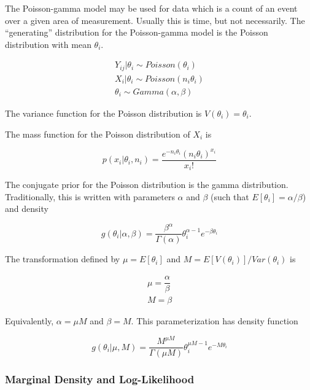 \documentclass[12pt,epsfig]{article}
\begin{document}
The Poisson-gamma model may be used for data which is a count of an event over a given area of measurement. Usually this is time, but not necessarily. The ``generating'' distribution for the Poisson-gamma model is the Poisson distribution with mean $\theta_i$.

\begin{gather*}
    Y_{ij} | \theta_i \sim Poisson(\theta_i)\\
    X_{i} | \theta_i \sim Poisson(n_i\theta_i)\\
    \theta_i \sim Gamma(\alpha, \beta)
\end{gather*}

\noindent The variance function for the Poisson distribution is $V(\theta_i) = \theta_i$.

The mass function for the Poisson distribution of $X_i$ is 

\begin{equation*}
    p(x_i | \theta_i, n_i) = \dfrac{e^{-n_i \theta_i} (n_i \theta_i)^{x_i}}{x_i !}
\end{equation*}

The conjugate prior for the Poisson distribution is the gamma distribution. Traditionally, this is written with parameters $\alpha$ and $\beta$ (such that $E[\theta_i] = \alpha/\beta$) and density

\begin{equation*}
       g(\theta_i | \alpha, \beta) = \dfrac{\beta^\alpha}{\Gamma(\alpha)} \theta_i^{\alpha - 1} e^{-\beta \theta_i}
\end{equation*}

The transformation defined by $\mu = E[\theta_i]$ and $M = E[V(\theta_i)]/Var(\theta_i)$ is

\begin{align*}
    \mu = \dfrac{\alpha}{\beta}\\
    M = \beta
\end{align*}

Equivalently, $\alpha = \mu M$ and $\beta = M$. This parameterization has density function

\begin{equation*}
   g(\theta_i | \mu, M) = \dfrac{M^{\mu M}}{\Gamma(\mu M)} \theta_i^{\mu M - 1} e^{-M \theta_i}
\end{equation*}

\subsubsection{Marginal Density and Log-Likelihood}
\end{document}
